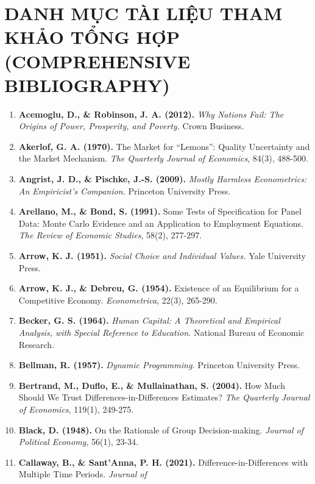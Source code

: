 \documentclass[
]{article}
\providecommand{\tightlist}{%
  \setlength{\itemsep}{0pt}\setlength{\parskip}{0pt}}
\begin{document}
\section{DANH MỤC TÀI LIỆU THAM KHẢO TỔNG HỢP (COMPREHENSIVE
BIBLIOGRAPHY)}\label{danh-mux1ee5c-tuxe0i-liux1ec7u-tham-khux1ea3o-tux1ed5ng-hux1ee3p-comprehensive-bibliography}

\begin{enumerate}
\def\labelenumi{\arabic{enumi}.}
\tightlist
\item
  \textbf{Acemoglu, D., \& Robinson, J. A. (2012).} \emph{Why Nations
  Fail: The Origins of Power, Prosperity, and Poverty.} Crown Business.
\item
  \textbf{Akerlof, G. A. (1970).} The Market for ``Lemons'': Quality
  Uncertainty and the Market Mechanism. \emph{The Quarterly Journal of
  Economics}, 84(3), 488-500.
\item
  \textbf{Angrist, J. D., \& Pischke, J.-S. (2009).} \emph{Mostly
  Harmless Econometrics: An Empiricist's Companion.} Princeton
  University Press.
\item
  \textbf{Arellano, M., \& Bond, S. (1991).} Some Tests of Specification
  for Panel Data: Monte Carlo Evidence and an Application to Employment
  Equations. \emph{The Review of Economic Studies}, 58(2), 277-297.
\item
  \textbf{Arrow, K. J. (1951).} \emph{Social Choice and Individual
  Values.} Yale University Press.
\item
  \textbf{Arrow, K. J., \& Debreu, G. (1954).} Existence of an
  Equilibrium for a Competitive Economy. \emph{Econometrica}, 22(3),
  265-290.
\item
  \textbf{Becker, G. S. (1964).} \emph{Human Capital: A Theoretical and
  Empirical Analysis, with Special Reference to Education.} National
  Bureau of Economic Research.
\item
  \textbf{Bellman, R. (1957).} \emph{Dynamic Programming.} Princeton
  University Press.
\item
  \textbf{Bertrand, M., Duflo, E., \& Mullainathan, S. (2004).} How Much
  Should We Trust Differences-in-Differences Estimates? \emph{The
  Quarterly Journal of Economics}, 119(1), 249-275.
\item
  \textbf{Black, D. (1948).} On the Rationale of Group Decision-making.
  \emph{Journal of Political Economy}, 56(1), 23-34.
\item
  \textbf{Callaway, B., \& Sant'Anna, P. H. (2021).}
  Difference-in-Differences with Multiple Time Periods. \emph{Journal of
}
\end{enumerate}
\end{document}
